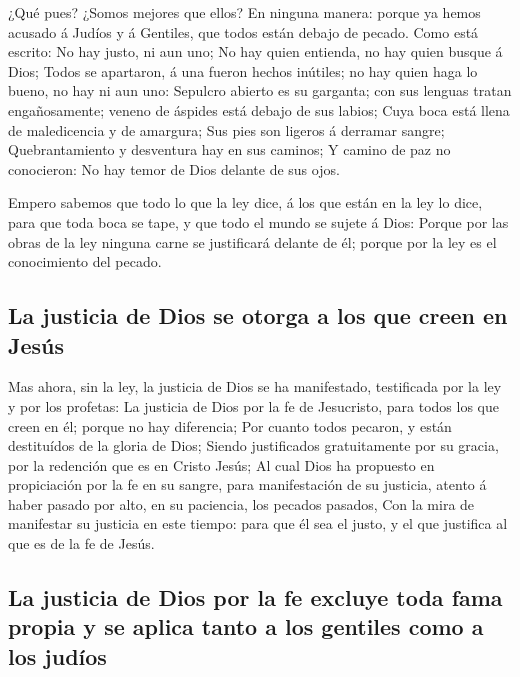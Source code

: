  ¿Qué pues? ¿Somos mejores que ellos? En ninguna manera:
porque ya hemos acusado á Judíos y á Gentiles, que todos están debajo de
pecado.  Como está escrito: No hay justo, ni aun uno;
 No hay quien entienda, no hay quien busque á Dios;
 Todos se apartaron, á una fueron hechos inútiles; no hay
quien haga lo bueno, no hay ni aun uno:  Sepulcro abierto
es su garganta; con sus lenguas tratan engañosamente; veneno de áspides
está debajo de sus labios;  Cuya boca está llena de
maledicencia y de amargura;  Sus pies son ligeros á
derramar sangre;  Quebrantamiento y desventura hay en sus
caminos;  Y camino de paz no conocieron:  No
hay temor de Dios delante de sus ojos.

 Empero sabemos que todo lo que la ley dice, á los que
están en la ley lo dice, para que toda boca se tape, y que todo el mundo
se sujete á Dios:  Porque por las obras de la ley ninguna
carne se justificará delante de él; porque por la ley es el conocimiento
del pecado.

\hypertarget{la-justicia-de-dios-se-otorga-a-los-que-creen-en-jesuxfas}{%
\subsection{La justicia de Dios se otorga a los que creen en
Jesús}\label{la-justicia-de-dios-se-otorga-a-los-que-creen-en-jesuxfas}}

 Mas ahora, sin la ley, la justicia de Dios se ha
manifestado, testificada por la ley y por los profetas:  La
justicia de Dios por la fe de Jesucristo, para todos los que creen en
él; porque no hay diferencia;  Por cuanto todos pecaron, y
están destituídos de la gloria de Dios;  Siendo
justificados gratuitamente por su gracia, por la redención que es en
Cristo Jesús;  Al cual Dios ha propuesto en propiciación
por la fe en su sangre, para manifestación de su justicia, atento á
haber pasado por alto, en su paciencia, los pecados pasados,
 Con la mira de manifestar su justicia en este tiempo: para
que él sea el justo, y el que justifica al que es de la fe de Jesús.

\hypertarget{la-justicia-de-dios-por-la-fe-excluye-toda-fama-propia-y-se-aplica-tanto-a-los-gentiles-como-a-los-juduxedos}{%
\subsection{La justicia de Dios por la fe excluye toda fama propia y se
aplica tanto a los gentiles como a los
judíos}\label{la-justicia-de-dios-por-la-fe-excluye-toda-fama-propia-y-se-aplica-tanto-a-los-gentiles-como-a-los-juduxedos}}

